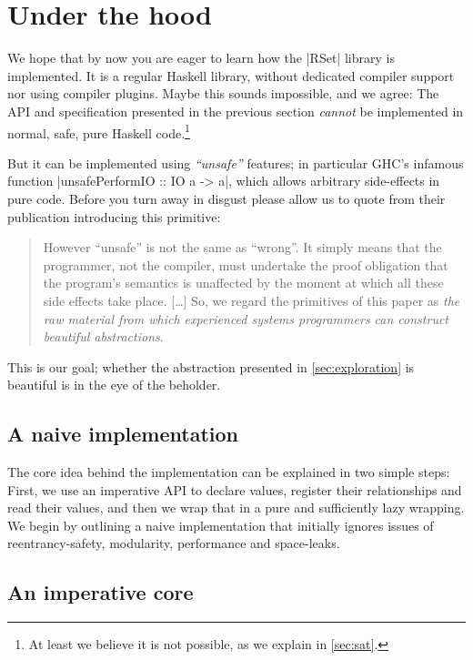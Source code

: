 \documentclass[manuscript,anonymous,screen,acmsmall]{acmart}
\begin{document}
\section{Under the hood}\label{sec:impl}

We hope that by now you are eager to learn how the |RSet| library is implemented. It is a regular Haskell library, without dedicated compiler support nor using compiler plugins. Maybe this sounds impossible, and we agree: The API and specification presented in the previous section \emph{cannot} be implemented in normal, safe, pure Haskell code.\footnote{At least we believe it is not possible, as we explain in \cref{sec:sat}.}

But it can be implemented using \emph{“unsafe”} features; in particular GHC's infamous function |unsafePerformIO :: IO a -> a|, which allows arbitrary side-effects in pure code. Before you turn away in disgust please allow us to quote \citet{unsafePerformIO} from their publication introducing this primitive:
\begin{quote}
However “unsafe” is not the same as “wrong”. It simply means that the programmer, not the compiler, must undertake the proof obligation that the program's semantics is unaffected by the moment at which all these side effects take place. [\ldots]
So, we regard the primitives of this paper as \emph{the raw material from which experienced systems programmers can construct beautiful abstractions}.
\end{quote}
This is our goal; whether the abstraction presented in \cref{sec:exploration} is beautiful is in the eye of the beholder.

\subsection{A naive implementation}

The core idea behind the implementation can be explained in two simple steps: First, we use an imperative API to declare values, register their relationships and read their values, and then we wrap that in a pure and sufficiently lazy wrapping. We begin by outlining a naive implementation that initially ignores issues of reentrancy-safety, modularity, performance and space-leaks.

\subsection{An imperative core}\label{sec:impcore}
\end{document}
